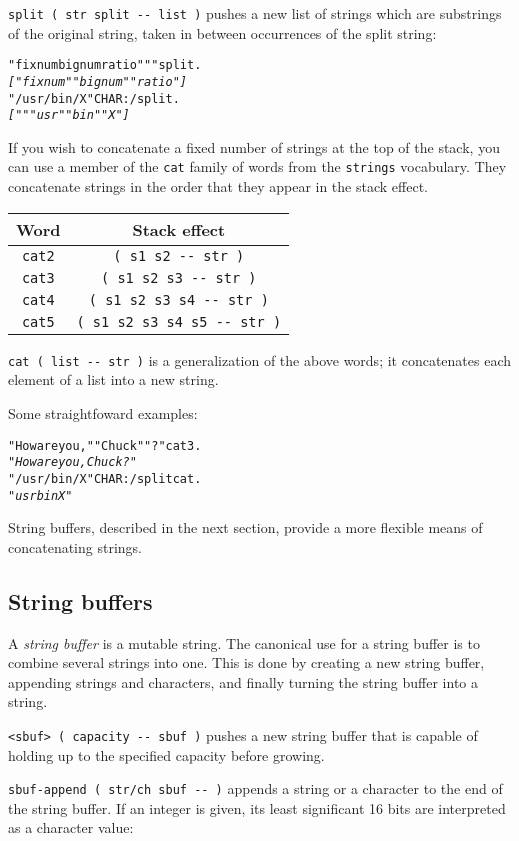 \documentclass[english]{article}
\providecommand{\tabularnewline}{\\}
\begin{document}
{\texttt{split ( str split -{}- list )} pushes a new list of strings
which are substrings of the original string, taken in between occurrences
of the split string:

\begin{alltt}
"fixnum bignum ratio" " " split .
\emph{{[} "fixnum" "bignum" "ratio" {]}}
"/usr/bin/X" CHAR: / split .
\emph{{[} "" "usr" "bin" "X" {]}}
\end{alltt}
If you wish to concatenate a fixed number of strings at the top of
the stack, you can use a member of the \texttt{cat} family of words
from the \texttt{strings} vocabulary. They concatenate strings in
the order that they appear in the stack effect.

\begin{tabular}{|c|c|}
\hline 
Word&
Stack effect\tabularnewline
\hline
\hline 
\texttt{cat2}&
\texttt{( s1 s2 -{}- str )}\tabularnewline
\hline 
\texttt{cat3}&
\texttt{( s1 s2 s3 -{}- str )}\tabularnewline
\hline 
\texttt{cat4}&
\texttt{( s1 s2 s3 s4 -{}- str )}\tabularnewline
\hline 
\texttt{cat5}&
\texttt{( s1 s2 s3 s4 s5 -{}- str )}\tabularnewline
\hline
\end{tabular}

\texttt{cat ( list -{}- str )} is a generalization of the above words;
it concatenates each element of a list into a new string.

Some straightfoward examples:

\begin{alltt}
"How are you, " "Chuck" "?" cat3 .
\emph{"How are you, Chuck?"}
"/usr/bin/X" CHAR: / split cat .
\emph{"usrbinX"}
\end{alltt}
String buffers, described in the next section, provide a more flexible
means of concatenating strings.


\subsection{String buffers}

A \emph{string buffer} is a mutable string. The canonical use for
a string buffer is to combine several strings into one. This is done
by creating a new string buffer, appending strings and characters,
and finally turning the string buffer into a string.

\texttt{<sbuf> ( capacity -{}- sbuf )} pushes a new string buffer
that is capable of holding up to the specified capacity before growing.

\texttt{sbuf-append ( str/ch sbuf -{}- )} appends a string or a character
to the end of the string buffer. If an integer is given, its least significant
16 bits are interpreted as a character value:

}
\end{document}

